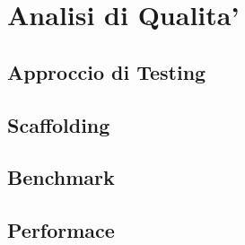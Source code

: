 \chapter{Analisi di Qualita'}

\section{Approccio di Testing}

\section{Scaffolding}

\section{Benchmark}

\section{Performace}
